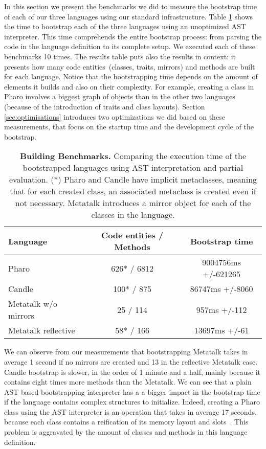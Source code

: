 In this section we present the benchmarks we did to measure the bootstrap time of each of our three languages using our standard infrastructure. Table \ref{tb:measurements} shows the time to bootstrap each of the three languages using an unoptimized AST interpreter. This time comprehends the entire bootstrap process: from parsing the code in the language definition to its complete setup. We executed each of these benchmarks 10 times. The results table puts also the results in context: it presents how many code entities~(classes, traits, mirrors) and methods are built for each language. Notice that the bootstrapping time depends on the amount of elements it builds and also on their complexity. For example, creating a class in Pharo involves a biggest graph of objects than in the other two languages (because of the introduction of traits and class layouts). Section \ref{sec:optimisations} introduces two optimizations we did based on these measurements, that focus on the startup time and the development cycle of the bootstrap. 

 \begin{table}[ht]
 \small
 	\centering
 	\begin{tabular}{|l|c|c|}
			\hline
			\textbf{Language}
			& \xspace\textbf{Code entities / Methods}\xspace
			& \xspace\textbf{Bootstrap time}\\
		\hline
		Pharo & 626* / 6812 & 9004756ms +/-621265 \\\hline
		Candle & 100* / 875 & 86747ms +/-8060 \\\hline
		Metatalk w/o mirrors & 25 / 114 & 957ms +/-112 \\\hline
		Metatalk reflective & 58* / 166 & 13697ms +/-61 \\\hline
 	\end{tabular}
		\vspace*{0.2cm}
 	\caption{\small\textbf{Building Benchmarks.} Comparing the execution time of the bootstrapped languages using AST interpretation and partial evaluation. (*) Pharo and Candle have implicit metaclasses, meaning that for each created class, an associated metaclass is created even if not necessary. Metatalk introduces a mirror object for each of the classes in the language.\label{tb:measurements}}
 \end{table}

We can observe from our measurements that bootstrapping Metatalk takes in average 1 second if no mirrors are created and 13 in the reflective Metatalk case. Candle bootstrap is slower, in the order of 1 minute and a half, mainly because it contains eight times more methods than the Metatalk. We can see that a plain AST-based bootstrapping interpreter has a a bigger impact in the bootstrap time if the language contains complex structures to initialize.  Indeed, creating a Pharo class using the AST interpreter is an operation that takes in average 17 seconds, because each class contains a reification of its memory layout and slots~\cite{Verw11a}. This problem is aggravated by the amount of classes and methods in this language definition.

